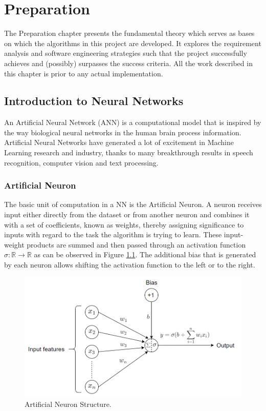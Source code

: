 

\chapter{Preparation}

The Preparation chapter presents the fundamental theory which serves as bases on which the algorithms in this project are developed. It explores the requirement analysis and software engineering strategies such that the project successfully achieves and (possibly) surpasses the success criteria. All the work described in this chapter is prior to any actual implementation.


\section{Introduction to Neural Networks}

An Artificial Neural Network (ANN) is a computational model that is inspired by the way biological neural networks in the human brain process information. Artificial Neural Networks have generated a lot of excitement in Machine Learning research and industry, thanks to many breakthrough results in speech recognition, computer vision and text processing.

\subsection{Artificial Neuron}

The basic unit of computation in a NN is the Artificial Neuron. A neuron receives input either directly from the dataset or from another neuron and combines it with a set of coefficients, known as weights, thereby assigning significance to inputs with regard to the task the algorithm is trying to learn. These input-weight products are summed and then passed through an activation function $\sigma : \mathbb{R} \rightarrow \mathbb{R}$ as can be observed in Figure \ref{Artificial Neuron}. The additional bias that is generated by each neuron allows shifting the activation function to the left or to the right. \\

\begin{figure}[H]
  \centering
  \includegraphics[scale = 0.35]{Images/artificial_neuron.png}
  \caption{Artificial Neuron Structure.}
  \label{Artificial Neuron}
\end{figure}

